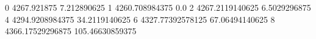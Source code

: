 0 4267.921875 7.212890625
1 4260.708984375 0.0
2 4267.2119140625 6.5029296875
4 4294.9208984375 34.2119140625
6 4327.77392578125 67.06494140625
8 4366.17529296875 105.46630859375
